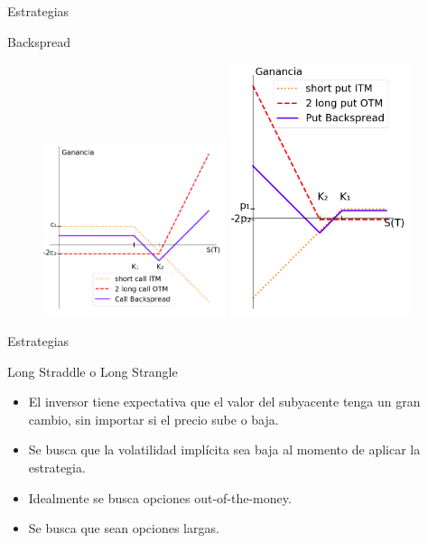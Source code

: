 \documentclass{beamer}
\begin{document}
\begin{frame}{Estrategias}


   \begin{block}{Backspread}

   \begin{figure}
            \includegraphics[width=0.475\textwidth]{backspread}
            \hfill
            \includegraphics[width=0.475\textwidth]{backspreadput}
        \end{figure}

    \end{block}

\end{frame}

\begin{frame}{Estrategias}

    \begin{block}{Long Straddle o Long Strangle}

      \begin{itemize}
        \item El inversor tiene expectativa que el valor del subyacente tenga un gran cambio, sin importar si el precio sube o baja.
        \item Se busca que la volatilidad impl\'icita sea baja al momento de aplicar la estrategia.
        \item Idealmente se busca opciones out-of-the-money. 
        \item Se busca que sean opciones largas.%
      \end{itemize}


    \end{block}

\end{frame}
\end{document}
